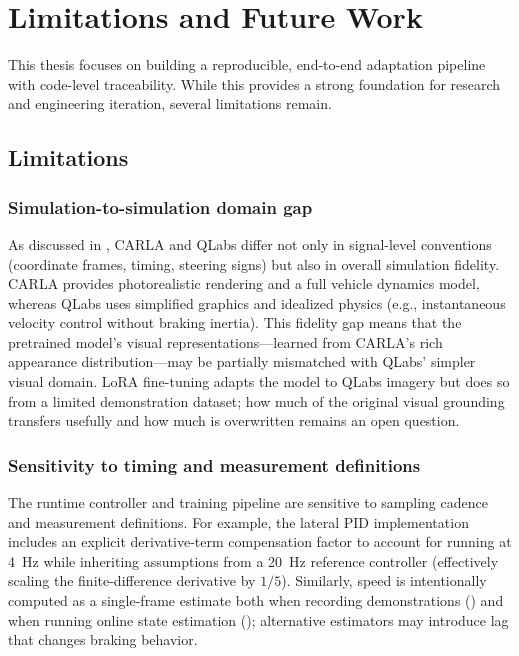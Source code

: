 \chapter{Limitations and Future Work}
\label{ch:limitations}

This thesis focuses on building a reproducible, end-to-end adaptation pipeline with code-level traceability. While this provides a strong foundation for research and engineering iteration, several limitations remain.

\section{Limitations}
\label{sec:limitations}
\subsection{Simulation-to-simulation domain gap}
As discussed in , CARLA and QLabs differ not only in signal-level conventions (coordinate frames, timing, steering signs) but also in overall simulation fidelity. CARLA provides photorealistic rendering and a full vehicle dynamics model, whereas QLabs uses simplified graphics and idealized physics (e.g., instantaneous velocity control without braking inertia). This fidelity gap means that the pretrained model's visual representations---learned from CARLA's rich appearance distribution---may be partially mismatched with QLabs' simpler visual domain. LoRA fine-tuning adapts the model to QLabs imagery but does so from a limited demonstration dataset; how much of the original visual grounding transfers usefully and how much is overwritten remains an open question.

\subsection{Sensitivity to timing and measurement definitions}
The runtime controller and training pipeline are sensitive to sampling cadence and measurement definitions. For example, the lateral PID implementation includes an explicit derivative-term compensation factor to account for running at \SI{4}{Hz} while inheriting assumptions from a \SI{20}{Hz} reference controller (effectively scaling the finite-difference derivative by $1/5$). Similarly, speed is intentionally computed as a single-frame estimate both when recording demonstrations () and when running online state estimation (); alternative estimators may introduce lag that changes braking behavior.

